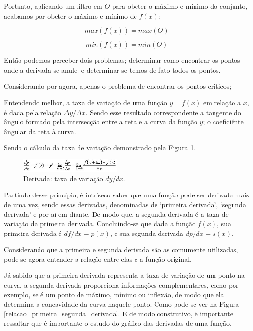 Portanto, aplicando um filtro em $O$ para obeter o máximo e mínimo do conjunto,
acabamos por obeter o máximo e mínimo de \(f(x)\):


\begin{equation}
    max(f(x)) = max(O)
\end{equation}

\begin{equation}
    min(f(x)) = min(O)
\end{equation}


Então podemos perceber dois problemas; determinar como encontrar os pontos onde
a derivada se anule, e determinar se temos de fato todos os pontos.

Considerando por agora, apenas o problema de encontrar os pontos críticos;

Entendendo melhor, a taxa de variação de uma função \(y=f(x)\) em relação a
\(x\), é dada pela relação \(\Delta y / \Delta x\). Sendo esse resultado
correspondente a tangente do ângulo formado pela intersecção entre a reta e a
curva da função \(y\); o coeficiênte ângular da reta à curva.

Sendo o cálculo da taxa de variação demonstrado pela Figura
\ref{derivada_padrao}.

\begin{figure}[h]
    \includegraphics[width=0.45\textwidth]
        {src/derivada_padrao.jpg}
    \centering
    \caption{Derivada: taxa de variação \(dy/dx\).}
    \label{derivada_padrao}
\end{figure}

Partindo desse princípio, é intríseco saber que uma função pode ser derivada
mais de uma vez, sendo essas derivadas, denominadas de `primeira derivada',
`segunda derivada' e por ai em diante. De modo que, a segunda derivada é
a taxa de variação da primeira derivada. Concluindo-se que dada a função
\(f(x)\), sua primeira derivada é \(df/dx = p(x)\), e sua segunda derivada
\(dp/dx = s(x)\).

Considerando que a primeira e segunda derivada são as comumente utilizadas,
pode-se agora entender a relação entre elas e a função original.

Já sabido que a primeira derivada representa a taxa de variação de um ponto na
curva, a segunda derivada proporciona informações complementares, como por
exemplo, se é um ponto de máximo, mínimo ou inflexão, de modo que ela determina
a concavidade da curva naquele ponto. Como pode-se ver na Figura
\ref{relacao_primeira_segunda_derivada}. E de modo construtivo, é importante
ressaltar que é importante o estudo do gráfico das derivadas de uma função.

